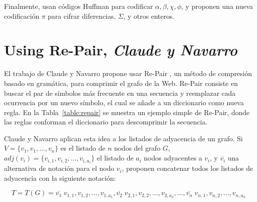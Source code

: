 

Finalmente, usan códigos Huffman para codificar $\alpha, \beta, \chi, \phi$, y proponen una nueva codificación $\pi$ para cifrar diferencias, $\Sigma$, y otros enteros.


\section{Using Re-Pair, \textit{Claude y Navarro}}
El trabajo de Claude y Navarro \cite{claude2010fast} propone usar Re-Pair \cite{larsson2000off}, un método de compresión basado en gramática, para comprimir el grafo de la Web. Re-Pair consiste en buscar el par de símbolos más frecuente en una secuencia y reemplazar cada ocurrencia por un nuevo símbolo, el cual se añade a un diccionario como nueva regla. En la Tabla~\ref{table:repair} se muestra un ejemplo simple de Re-Pair, donde las reglas conforman el diccionario para descomprimir la secuencia.



Claude y Navarro \cite{claude2010fast} aplican esta idea a los listados de adyacencia de un grafo. Si $V = \{v_{1}, v_{1}, ..., v_{n}\}$ es el listado de $n$ nodos del grafo $G$, $adj(v_{i}) = \{v_{i,1}, v_{i,2},... , v_{i,a_{i}}\}$ el listado de $a_{i}$ nodos adyacentes a $v_{i}$, y $\overline{v_{i}}$ una alternativa de notación para el nodo $v_{i}$, proponen concatenar todos los listados de adyacencia con la siguiente notación:

\begin{equation} \label{eq:RepairGrafo}
	T = T(G) = \overline{v_{1}} \; v_{1,1}, v_{1,2}, ..., v_{1,a_{1}}, \overline{v_{2}} \; v_{2,1}, v_{2,2}, ..., v_{2,a_{2}}, ..., \overline{v_{n}} \; v_{n,1}, v_{n,2}, ..., v_{n,a_{n}}
\end{equation}

